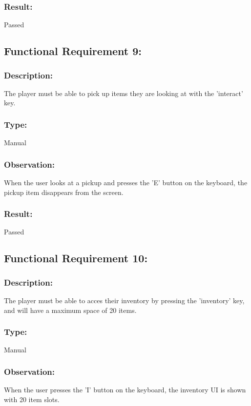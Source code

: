 \documentclass[12pt, titlepage]{article}
\begin{document}
\subsubsection[Pass / Fail:] {Result: } Passed


\subsection{Functional Requirement 9: } 

\subsubsection{Description: }The player must be able to pick up items they are looking at with the 'interact' key.

\subsubsection{Type: } Manual

\subsubsection{Observation: } When the user looks at a pickup and presses the 'E' button on the keyboard, the pickup item disappears from the screen. 

\subsubsection[Pass / Fail:] {Result: } Passed


\subsection{Functional Requirement 10: } 

\subsubsection{Description: }The player must be able to acces their inventory by pressing the 'inventory' key, and will have a maximum space of 20 items.

\subsubsection{Type: } Manual

\subsubsection{Observation: } When the user  presses the 'I' button on the keyboard, the inventory UI is shown with 20 item slots. 
\end{document}
